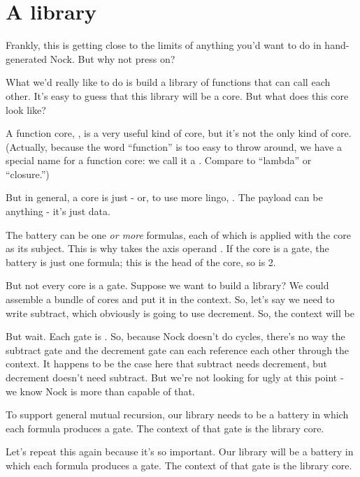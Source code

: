 \section{A library}

Frankly, this is getting close to the limits of anything you'd
want to do in hand-generated Nock.  But why not press on?

What we'd really like to do is build a library of functions that
can call each other.  It's easy to guess that this library will
be a core.  But what does this core look like?

A function core, , is a very useful
kind of core, but it's not the only kind of core.  (Actually,
because the word ``function'' is too easy to throw around, we have
a special name for a function core: we call it a .  Compare
to ``lambda'' or ``closure.'')

But in general, a core is just  - or, to use more
lingo, .  The payload can be anything - it's
just data.

The battery can be one \emph{or more} formulas, each of which is
applied with the core as its subject.  This is why  takes the
axis operand .  If the core is a gate, the battery is just one
formula; this is the head of the core, so  is 2.

But not every core is a gate.  Suppose we want to build a
library?  We could assemble a bundle of cores and put it in
the context.  So, let's say we need to write subtract, which
obviously is going to use decrement.  So, the context will be

\begin{code}
\end{code}
But wait.  Each gate is .  So, because
Nock doesn't do cycles, there's no way the subtract gate and the
decrement gate can each reference each other through the context.
It happens to be the case here that subtract needs decrement, but
decrement doesn't need subtract.  But we're not looking for ugly
at this point - we know Nock is more than capable of that.

To support general mutual recursion, our library needs to be a
battery in which each formula produces a gate.  The context of
that gate is the library core.

Let's repeat this again because it's so important.  Our library
will be a battery in which each formula produces a gate.  The
context of that gate is the library core.

